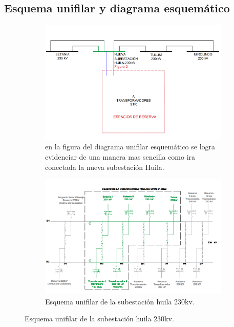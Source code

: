 

\subsection*{Esquema unifilar y diagrama esquemático}
\begin{figure}[h!] %
    \centering %
    \begin{subfigure}{0.5\textwidth}
        \includegraphics[width=1\textwidth]{1mer avance foticos/Esquema unifilar diagrama esquemático.png}
        \caption{en la figura del diagrama unifilar esquemático se logra evidenciar de una manera mas sencilla como ira conectada la nueva subestación Huila.} %
        \label{fig:Esquema} %
    \end{subfigure}
    \hfill %
    \begin{subfigure}{0.5\textwidth}
        \centering %
        \includegraphics[width=1\textwidth]{1mer avance foticos/Esquema unifilar de la subestación huila 230kv.png}
        \caption{Esquema unifilar de la subestación huila 230kv.} %
        \label{fig:unifilar} %
    \end{subfigure}
    \label{fig:dos-imagenes}
\end{figure}

